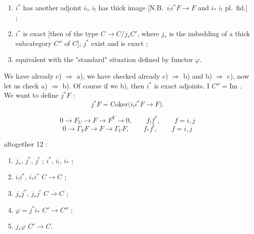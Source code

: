 \documentclass[11pt,a4paper]{article}
\begin{document}
\begin{enumerate}
\item[a)] $i^{*}$  has another adjoint $i_{!}$, $i_{!}$
       has thick image [N.B.\ $i_{!} i^{*}F \to F$ \ill{} and
      $i_{*}$ \ill{} $i_{!}$ pl.\ fid.] ;
\item[b)] $i^{*}$ is \struck{\ill{}} exact [then of the type $C \to C/j_{*}C'$,
      where $j_{*}$ is the imbedding of a thick subcategory $C''$ of $C$],
      $j^{*}$ exist and is exact ;
\item[c)] equivalent with the "standard" situation defined by 
      functor $\varphi$.
\end{enumerate}


We have already  c) $\Longrightarrow$ a), we have checked
already c) $\Longrightarrow$ b) and b) $\Longrightarrow$ c), now let us check
a) $\Longrightarrow$ b). Of course if we  b), then $i^{*}$
is exact  adjoints. \struck{\ill{}} I \ill{} $C'' =
\mathrm{Im}$ \ill{}. We want to define $j^{*}F$ :
\[
  j^{*}F = \mathrm{Coker}\bigl(i_{!} i^{*} F \longrightarrow F\bigr) .
\]



\[
  0 \to F_{U} \to F \to F^{Y} \to 0 , \qquad f_{!} f^{*} , \qquad f = i, j
\]
\[
  0 \to \Gamma_{Y} F \to F \to \Gamma_{U} F , \qquad f_{*} f^{!} , \qquad
  f = i, j
\]

altogether 12  \ill{} :

\begin{enumerate}
\item[] $j_{*}$, $j^{*}$, $j^{!}$ \quad ; \quad $i^{*}$, $i_{!}$, $i_{*}$ ;
\item[] $i_{!} i^{*}$, $i_{*} i^{*}$ \quad $C \to C$ ;
\item[] $j_{*} j^{*}$, $j_{*} j^{!}$ \quad $C \to C$ ;
\item[] $\varphi = j^{*} i_{*}$ \quad $C' \to C''$ ;
\item[] $j_{*} \varphi$ \quad $C' \to C$.
\end{enumerate}
\end{document}
